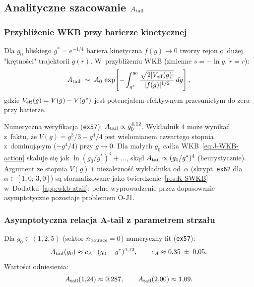 \subsection{Analityczne szacowanie $A_{\rm tail}$}\label{app:J-analityczne}

\subsubsection{Przybliżenie WKB przy barierze kinetycznej}

Dla $g_0$ bliskiego $g^* = e^{-1/4}$ bariera kinetyczna $f(g) \to 0$
tworzy rejon o~dużej "krętności" trajektorii $g(r)$.
W~przybliżeniu WKB (zmienne $s = -\ln g$, $\tilde{r} = r$):
\begin{equation}\label{eq:J-WKB-action}
  A_{\rm tail} \;\sim\; A_0\,\exp\!\left[-\int_{g^*}^{g_0}
    \frac{\sqrt{2|V_{\rm eff}(g)|}}{|f(g)|^{1/2}}\,dg\right],
\end{equation}
gdzie $V_{\rm eff}(g) = V(g) - V(g^*)$ jest potencjałem efektywnym
przesunietym do zera przy barierze.

\begin{remark}\label{rem:J-exp4}
Numeryczna weryfikacja (\texttt{ex57}): $A_{\rm tail} \propto g_0^{4{,}12}$.
Wykładnik $4$ może wynikać z~faktu, że $V(g) = g^3/3 - g^4/4$
jest wielomianem czwartego stopnia z~dominującym ($-g^4/4$) przy $g \to 0$.
Dla małych $g_0$ całka WKB~\eqref{eq:J-WKB-action} skaluje się jak
$\ln(g_0/g^*)^4 + \ldots$, skąd $A_{\rm tail} \propto (g_0/g^*)^4$
(heurystycznie). Argument ze stopnia $V(g)$ i~niezależność wykładnika od~$\alpha$
(skrypt~\texttt{ex62} dla $\alpha \in [1{,}0;\, 3{,}0]$) są sformalizowane
jako twierdzenie~\ref{res:K-SWKB} w~Dodatku~\ref{app:wkb-atail};
pełne wyprowadzenie przez dopasowanie asymptotyczne pozostaje problemem O-J1.
\end{remark}

\subsubsection{Asymptotyczna relacja A-tail z parametrem strzału}

Dla $g_0 \in (1, 2{,}5)$ (sektor $n_{\rm bounce} = 0$) numeryczny fit (\texttt{ex57}):
\begin{equation}\label{eq:J-fit}
  A_{\rm tail}(g_0) \approx c_A \cdot (g_0 - g^*)^{4{,}12},
  \qquad
  c_A \approx 0{,}35 \;\pm\; 0{,}05.
\end{equation}
Wartości odniesienia:
\begin{equation}\label{eq:J-Atail-values}
  A_{\rm tail}(1{,}24) \approx 0{,}287,
  \qquad
  A_{\rm tail}(2{,}00) \approx 1{,}09.
\end{equation}

